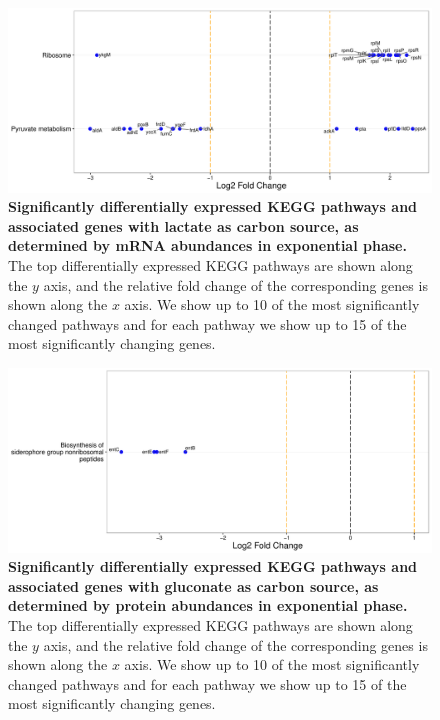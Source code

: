 \documentclass[a4paper]{article}
\begin{document}
\clearpage
\begin{figure}
	\includegraphics[width=1.0\textwidth]{../../d_figures/kegg_03.pdf}
	\caption[Significantly differentially expressed KEGG pathways for mRNA samples in exponential phase tested for lactate against glucose]
	{\textbf{Significantly differentially expressed KEGG pathways and associated genes with lactate as carbon source, as determined by mRNA abundances in exponential phase.} The top differentially expressed KEGG pathways are shown along the $y$ axis, and the relative fold change of the corresponding genes is shown along the $x$ axis. We show up to 10 of the most significantly changed pathways and for each pathway we show up to 15 of the most significantly changing genes.}
\end{figure}

\clearpage
\begin{figure}
	\includegraphics[width=1.0\textwidth]{../../d_figures/kegg_04.pdf}
	\caption[Significantly differentially expressed KEGG pathways for protein samples in exponential phase tested for gluconate against glucose]
	{\textbf{Significantly differentially expressed KEGG pathways and associated genes with gluconate as carbon source, as determined by protein abundances in exponential phase.} The top differentially expressed KEGG pathways are shown along the $y$ axis, and the relative fold change of the corresponding genes is shown along the $x$ axis. We show up to 10 of the most significantly changed pathways and for each pathway we show up to 15 of the most significantly changing genes.}
\end{figure}
\end{document}
